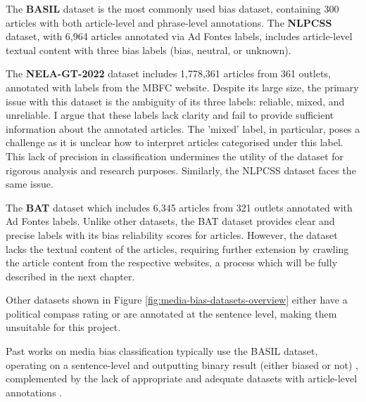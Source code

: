 The \textbf{BASIL} dataset \cite{fan-2019-basil} is the most commonly used bias dataset, containing 300 articles with both article-level and phrase-level annotations. The \textbf{NLPCSS} \cite{chen-2020-nlpcss} dataset, with 6,964 articles annotated via Ad Fontes labels, includes article-level textual content with three bias labels (bias, neutral, or unknown).

The \textbf{NELA-GT-2022} dataset \cite{gruppi-2023-nela-gt-2022} includes 1,778,361 articles from 361 outlets, annotated with labels from the MBFC \cite{mbfc} website. Despite its large size, the primary issue with this dataset is the ambiguity of its three labels: reliable, mixed, and unreliable. I argue that these labels lack clarity and fail to provide sufficient information about the annotated articles. The 'mixed' label, in particular, poses a challenge as it is unclear how to interpret articles categorised under this label. This lack of precision in classification undermines the utility of the dataset for rigorous analysis and research purposes. Similarly, the NLPCSS dataset faces the same issue.

The \textbf{BAT} dataset \cite{spinde-2023-bat} which includes 6,345 articles from 321 outlets annotated with Ad Fontes labels. Unlike other datasets, the BAT dataset provides clear and precise labels with its bias reliability scores for articles. However, the dataset lacks the textual content of the articles, requiring further extension by crawling the article content from the respective websites, a process which will be fully described in the next chapter.

Other datasets shown in Figure \ref{fig:media-bias-datasets-overview} either have a political compass rating or are annotated at the sentence level, making them unsuitable for this project.

Past works on media bias classification typically use the BASIL dataset, operating on a sentence-level and outputting binary result (either biased or not) \cite{maab-2023-lexical-bias-detection, maab-2023-target-aware, guo-2022-modeling, van-den-berg-2020-context,lee-2021-unifying,lei-2022-sentence,lei-2024-event-relation,krieger-2022-domain}, complemented by the lack of appropriate and adequate datasets with article-level annotations \cite{demidov-2023-political-bias-classification}.

